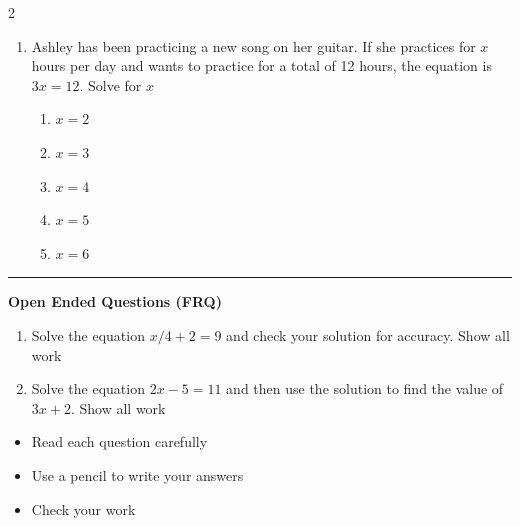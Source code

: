\documentclass[10pt]{article}
\begin{document}
\begin{multicols}{2}
\begin{enumerate}[label=\textbf{Q\arabic*.}, leftmargin=*, itemsep=6pt, parsep=0pt]
  \item \small Ashley has been practicing a new song on her guitar. If she practices for $x$ hours per day and wants to practice for a total of 12 hours, the equation is $3x = 12$. Solve for $x$
  \begin{enumerate}[label=(\Alph*), leftmargin=0.6cm, nosep, itemsep=2pt]
    \item $x = 2$
    \item $x = 3$
    \item $x = 4$
    \item $x = 5$
    \item $x = 6$
  \end{enumerate}

\end{enumerate}
\end{multicols}

\vspace{-0.2cm}
\hrule
\vspace{0.2cm}
\textbf{\small Open Ended Questions (FRQ)}
\begin{enumerate}[label=\textbf{Q\arabic*.}, start=9, itemsep=5pt, topsep=0pt]

  \item \small Solve the equation $x/4 + 2 = 9$ and check your solution for accuracy. Show all work \vspace{2cm}

  \item \small Solve the equation $2x - 5 = 11$ and then use the solution to find the value of $3x + 2$. Show all work \vspace{2cm}

\end{enumerate}

\vfill

\begin{tcolorbox}[colback=blue!5, colframe=mainblue!50, title=\small \textbf{Chef's Tips}, fonttitle=\bfseries, bottom=1mm]
\begin{itemize}[noitemsep, topsep=2pt, leftmargin=0.5cm]
  \item \scriptsize Read each question carefully\item \scriptsize Use a pencil to write your answers\item \scriptsize Check your work
\end{itemize}
\end{tcolorbox}
\end{document}
